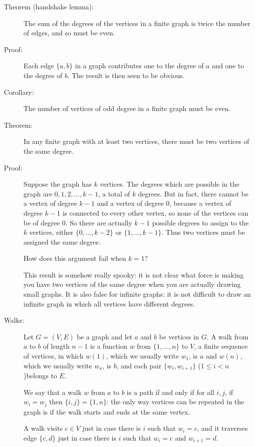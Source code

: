 \documentclass[12pt]{article}
\begin{document}
\begin{description}
\item[Theorem (handshake lemma):]  The sum of the degrees of the vertices in a finite graph is twice the number of edges, and so must be even.

\item[Proof:]  Each edge $\{a,b\}$ in a graph contributes one to the degree of $a$ and one to the degree of $b$.
The result is then seen to be obvious.

\item[Corollary:]  The number of vertices of odd degree in a finite graph must be even.

\item[Theorem:]  In any finite graph with at least two vertices, there must be two vertices of the same degree.

\item[Proof:]  Suppose the graph has $k$ vertices.  The degrees which are possible in the graph are
$0,1,2,\ldots,k-1$, a total of $k$ degrees.  But in fact, there cannot be a vertex of degree $k-1$ and a vertex of degree 0,
because a vertex of degree $k-1$ is connected to every other vertex, so none of the vertices can be of degree 0.
So there are actually $k-1$ possible degrees to assign to the $k$ vertices, either $\{0,\ldots,k-2\}$ or
$\{1,\ldots,k-1\}$.  Thus two vertices must be assigned the same degree.

How does this argument fail when $k=1$?

This result is somehow really spooky:  it is not clear what force is making you have two vertices of the same degree when you are actually drawing small graphs.  It is also false for infinite graphs:  it is not difficult to draw an infinite graph in which all vertices have different degrees.

\item[Walks:]  Let $G=(V,E)$ be a graph and let $a$ and $b$ be vertices in $G$.  A walk from $a$ to $b$ of length $n-1$ is a function $w$ from $\{1,\ldots,n\}$ to $V$, a finite sequence of vertices, in which $w(1)$, which we usually write $w_1$, is $a$ and $w(n)$, which we usually write $w_n$, is $b$, and each pair $\{w_i,w_{i+1}\}$ ($1 \leq i <n$)belongs to $E$.  

We say that a walk $w$ from $a$ to $b$ is a path if and only if for all $i,j$, if $w_i = w_j$ then $\{i,j\}=\{1,n\}$:  the only way vertices can be repeated in the graph is if the walk starts and ends at the same vertex.

A walk visits $c \in V$ just in case there is $i$ such that $w_i = c$, and it traverses edge $\{c,d\}$ just in case there is $i$ such that $w_i = c$ and $w_{i+1}=d$.


\end{description}
\end{document}
